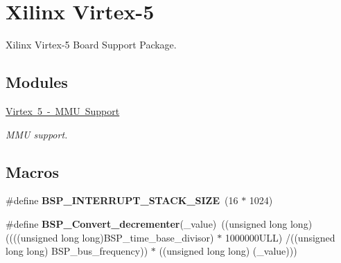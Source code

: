 \hypertarget{group__RTEMSBSPsPowerPCVirtex5}{}\section{Xilinx Virtex-\/5}
\label{group__RTEMSBSPsPowerPCVirtex5}


Xilinx Virtex-\/5 Board Support Package.  


\subsection*{Modules}
\begin{DoxyCompactItemize}
\item 
\mbox{\hyperlink{group__Virtex5MMU}{Virtex 5 -\/ M\+M\+U Support}}
\begin{DoxyCompactList}\small\item\em M\+MU support. \end{DoxyCompactList}\end{DoxyCompactItemize}
\subsection*{Macros}
\begin{DoxyCompactItemize}
\item 
\mbox{\label{group__RTEMSBSPsPowerPCVirtex5_gaae9597381ef6e8194012ad0c6168cf79}} 
\#define {\bfseries B\+S\+P\+\_\+\+I\+N\+T\+E\+R\+R\+U\+P\+T\+\_\+\+S\+T\+A\+C\+K\+\_\+\+S\+I\+ZE}~(16 $\ast$ 1024)
\item 
\mbox{\label{group__RTEMSBSPsPowerPCVirtex5_ga5b3b7a8f2f89a6110c93e0229f67c104}} 
\#define {\bfseries B\+S\+P\+\_\+\+Convert\+\_\+decrementer}(\+\_\+value)~((unsigned long long) ((((unsigned long long)B\+S\+P\+\_\+time\+\_\+base\+\_\+divisor) $\ast$ 1000000\+U\+L\+L) /((unsigned long long) B\+S\+P\+\_\+bus\+\_\+frequency)) $\ast$ ((unsigned long long) (\+\_\+value)))
\end{DoxyCompactItemize}
